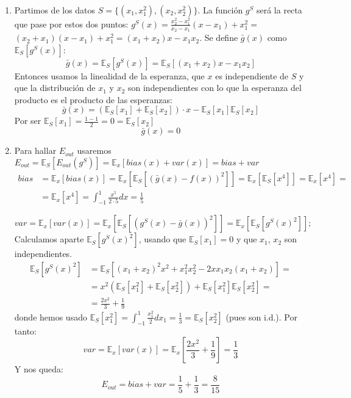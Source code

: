\documentclass[11pt,leqno]{article}
\theoremstyle{definition}
\begin{document}
\begin{solucion} \textbf{ }
\begin{enumerate}[a]
\item Partimos de los datos $S = \{(x_1, x^2_1), (x_2 , x_2^2)\}$. La función $g^S$ será la recta que pase por estos dos puntos: $g^S(x) = \frac{x_2^2-x^2_1}{x_2-x_1} (x-x_1) + x_1^2=$ $(x_2+x_1) (x-x_1) + x_1^2 = (x_1 + x_2) x - x_1 x_2$. Se define $\bar{g}(x)$ como $\mathbb{E}_S [g^S(x)]$:
	\[ \bar{g}(x) = \mathbb{E}_S [g^S(x)] = \mathbb{E}_S [ (x_1 + x_2) x - x_1 x_2 ] \]
	Entonces usamos la linealidad de la esperanza, que $x$ es independiente de $S$ y que la distribución de $x_1$ y $x_2$ son independientes con lo que la esperanza del producto es el producto de las esperanzas:
	\[ \bar{g}(x) = ( \mathbb{E}_S [ x_1 ] + \mathbb{E}_S [ x_2 ] ) \cdot x -
						\mathbb{E}_S [ x_1 ] \mathbb{E}_S [ x_2 ] \]
	Por ser $\mathbb{E}_S [ x_1 ] = \frac{1 - 1}{2} = 0 = \mathbb{E}_S [ x_2 ]$
	\[ \bar{g}(x) = 0 \]
\item Para hallar $E_{out}$ usaremos $E_{out} = \mathbb{E}_S [ E_{out}(g^S) ] = \mathbb{E}_x [ bias(x) + var(x) ] = bias + var$
		\begin{equation}
		\begin{split}
		 bias & = \mathbb{E}_x [ bias(x) ] = \mathbb{E}_x [ \mathbb{E}_S [ (\bar{g}(x) - f(x) )^2 ] ] =  
			\mathbb{E}_x [ \mathbb{E}_S [ x^4 ] ] = \mathbb{E}_x [ x^4 ] = \\
			& = \mathbb{E}_x [ x^4 ] = \int_{-1}^1 \frac{x^5}{2 \cdot 5} dx = \frac{1}{5}
		\end{split}
		\end{equation}
	
	\[ var = \mathbb{E}_x [ var(x) ] = \mathbb{E}_x [ \mathbb{E}_S [ (g^S(x) - \bar{g}(x))^2 ] ] =  
			\mathbb{E}_x [ \mathbb{E}_S [ g^S(x)^2 ] ];\]
		Calculamos aparte $\mathbb{E}_S [ g^S(x)^2 ]$, usando que $\mathbb{E}_S [ x_1 ] = 0$ y que $x_1$, $x_2$ son independientes.
		\begin{equation}
		\begin{split}
			\mathbb{E}_S \left[ g^S(x)^2 \right] &=  \mathbb{E}_S \left[ (x_1 + x_2)^2 x^2 + x_1^2 x_2^2 - 2x x_1 x_2 (x_1 + x_2) \right] =\\
 				& = x^2 (\mathbb{E}_S \left[ x_1^2 \right] + \mathbb{E}_S \left[ x_2^2 \right]) + 
 															\mathbb{E}_S \left[ x_1^2 \right]\mathbb{E}_S \left[ x_2^2 \right] = \\
 				& = \frac{2 x^2}{3} + \frac{1}{9} 
		\end{split}
		\end{equation}
	donde hemos usado $\mathbb{E}_S\left [x_1^2 \right] = \int_{-1}^1 \frac{x_1^2}{2} dx_1 = \frac{1}{3} = \mathbb{E}_S \left[ x_2^2 \right]$ (pues son i.d.). Por tanto:
	\[ var = \mathbb{E}_x [ var(x) ] = \mathbb{E}_x \left[ \frac{2 x^2}{3} + \frac{1}{9} \right] = \frac{1}{3} \]
	Y nos queda:
	\[ E_{out} = bias + var = \frac{1}{5} + \frac{1}{3} = \frac{8}{15} \]
\end{enumerate}
\end{solucion}
\end{document}
